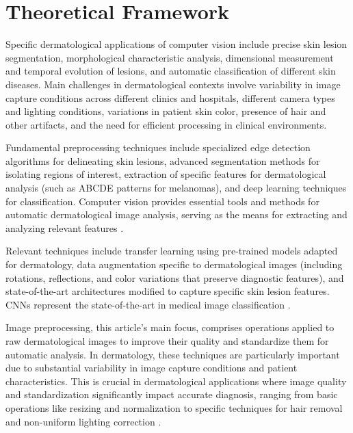\documentclass[journal]{IEEEtran}
\begin{document}
\section{Theoretical Framework}

Specific dermatological applications of computer vision include precise skin lesion segmentation, morphological characteristic analysis, dimensional measurement and temporal evolution of lesions, and automatic classification of different skin diseases. Main challenges in dermatological contexts involve variability in image capture conditions across different clinics and hospitals, different camera types and lighting conditions, variations in patient skin color, presence of hair and other artifacts, and the need for efficient processing in clinical environments.

Fundamental preprocessing techniques include specialized edge detection algorithms for delineating skin lesions, advanced segmentation methods for isolating regions of interest, extraction of specific features for dermatological analysis (such as ABCDE patterns for melanomas), and deep learning techniques for classification. Computer vision provides essential tools and methods for automatic dermatological image analysis, serving as the means for extracting and analyzing relevant features \cite{ARORA2021102358}.

Relevant techniques include transfer learning using pre-trained models adapted for dermatology, data augmentation specific to dermatological images (including rotations, reflections, and color variations that preserve diagnostic features), and state-of-the-art architectures modified to capture specific skin lesion features. CNNs represent the state-of-the-art in medical image classification \cite{DASH2020106240}.

Image preprocessing, this article's main focus, comprises operations applied to raw dermatological images to improve their quality and standardize them for automatic analysis. In dermatology, these techniques are particularly important due to substantial variability in image capture conditions and patient characteristics. This is crucial in dermatological applications where image quality and standardization significantly impact accurate diagnosis, ranging from basic operations like resizing and normalization to specific techniques for hair removal and non-uniform lighting correction \cite{9780692}.
\end{document}
